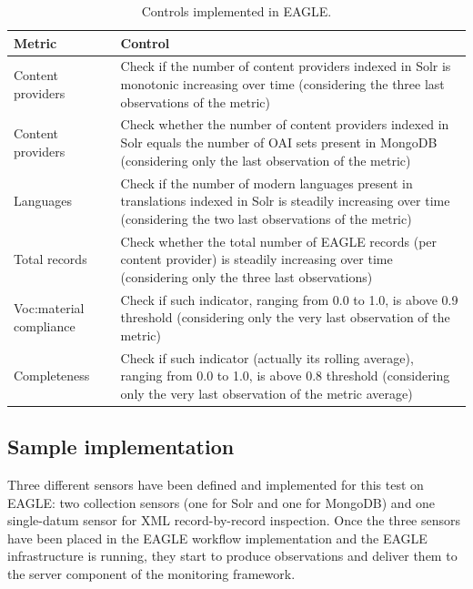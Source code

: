 \documentclass[amsthm,ebook]{saparticle}
\begin{document}
\begin{table}
{\small
\addtolength{\tabcolsep}{-0.5mm}
\begin{tabular*}{\textwidth}{ l l }
\toprule
Metric & Control\\
\midrule
Content providers & \parbox[t]{0.6\textwidth}{Check if the number of content providers indexed in Solr is monotonic increasing over time (considering the three last observations of the metric)}\\
Content providers & \parbox[t]{0.6\textwidth}{Check whether the number of content providers indexed in Solr equals the number of OAI sets present in MongoDB (considering only the last observation of the metric)}\\
Languages & \parbox[t]{0.6\textwidth}{Check if the number of modern languages present in translations indexed in Solr is steadily increasing over time (considering the two last observations of the metric)}\\
Total records & \parbox[t]{0.6\textwidth}{Check whether the total number of EAGLE records (per content provider) is steadily increasing over time (considering only the three last observations)}\\
Voc:material compliance & \parbox[t]{0.6\textwidth}{Check if such indicator, ranging from 0.0 to 1.0, is above 0.9 threshold (considering only the very last observation of the metric)}\\
Completeness & \parbox[t]{0.6\textwidth}{Check if such indicator (actually its rolling average), ranging from 0.0 to 1.0, is above 0.8 threshold (considering only the very last observation of the metric average)}\\
\bottomrule
\end{tabular*}}
\caption{Controls implemented in EAGLE.}
\label{tab:controls}
\end{table}


\subsection{Sample implementation}\label{sample}

\noindent Three different sensors have been defined and implemented for this test on EAGLE: two collection sensors (one for Solr and one for MongoDB) and one single-datum sensor for XML record-by-record inspection. Once the three sensors have been placed in the EAGLE workflow implementation and the EAGLE infrastructure is running, they start to produce observations and deliver them to the server component of the monitoring framework.
\end{document}
